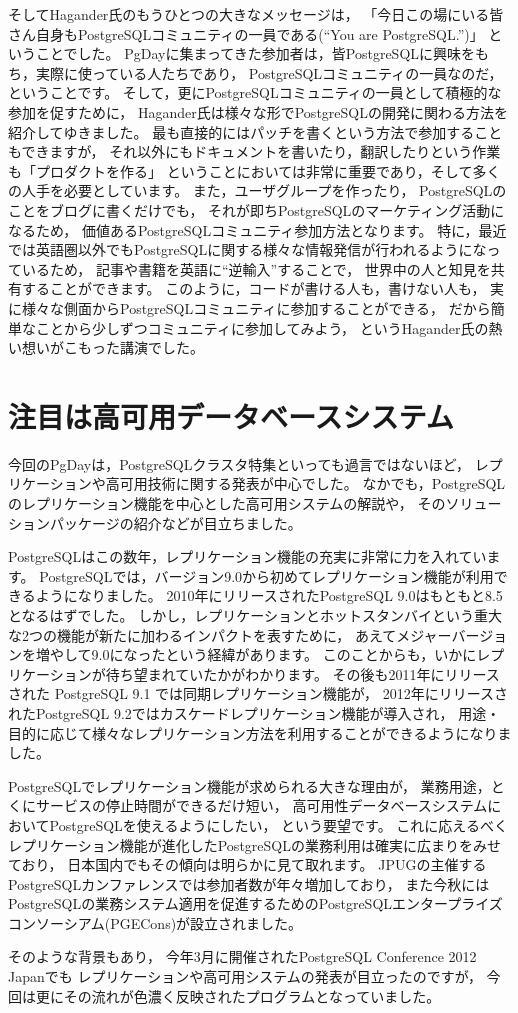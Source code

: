 そしてHagander氏のもうひとつの大きなメッセージは，
「今日この場にいる皆さん自身もPostgreSQLコミュニティの一員である(``You are PostgreSQL.'')」
ということでした。
PgDayに集まってきた参加者は，皆PostgreSQLに興味をもち，実際に使っている人たちであり，
PostgreSQLコミュニティの一員なのだ，ということです。
そして，更にPostgreSQLコミュニティの一員として積極的な参加を促すために，
Hagander氏は様々な形でPostgreSQLの開発に関わる方法を紹介してゆきました。
最も直接的にはパッチを書くという方法で参加することもできますが，
それ以外にもドキュメントを書いたり，翻訳したりという作業も「プロダクトを作る」
ということにおいては非常に重要であり，そして多くの人手を必要としています。
また，ユーザグループを作ったり，
PostgreSQLのことをブログに書くだけでも，
それが即ちPostgreSQLのマーケティング活動になるため，
価値あるPostgreSQLコミュニティ参加方法となります。
特に，最近では英語圏以外でもPostgreSQLに関する様々な情報発信が行われるようになっているため，
記事や書籍を英語に``逆輸入''することで，
世界中の人と知見を共有することができます。
このように，コードが書ける人も，書けない人も，
実に様々な側面からPostgreSQLコミュニティに参加することができる，
だから簡単なことから少しずつコミュニティに参加してみよう，
というHagander氏の熱い想いがこもった講演でした。

\section{注目は高可用データベースシステム}

今回のPgDayは，PostgreSQLクラスタ特集といっても過言ではないほど，
レプリケーションや高可用技術に関する発表が中心でした。
なかでも，PostgreSQLのレプリケーション機能を中心とした高可用システムの解説や，
そのソリューションパッケージの紹介などが目立ちました。

PostgreSQLはこの数年，レプリケーション機能の充実に非常に力を入れています。
PostgreSQLでは，バージョン9.0から初めてレプリケーション機能が利用できるようになりました。
2010年にリリースされたPostgreSQL 9.0はもともと8.5となるはずでした。
しかし，レプリケーションとホットスタンバイという重大な2つの機能が新たに加わるインパクトを表すために，
あえてメジャーバージョンを増やして9.0になったという経緯があります。
このことからも，いかにレプリケーションが待ち望まれていたかがわかります。
その後も2011年にリリースされた PostgreSQL 9.1 では同期レプリケーション機能が，
2012年にリリースされたPostgreSQL 9.2ではカスケードレプリケーション機能が導入され，
用途・目的に応じて様々なレプリケーション方法を利用することができるようになりました。

PostgreSQLでレプリケーション機能が求められる大きな理由が，
業務用途，とくにサービスの停止時間ができるだけ短い，
高可用性データベースシステムにおいてPostgreSQLを使えるようにしたい，
という要望です。
これに応えるべくレプリケーション機能が進化したPostgreSQLの業務利用は確実に広まりをみせており，
日本国内でもその傾向は明らかに見て取れます。
JPUGの主催するPostgreSQLカンファレンスでは参加者数が年々増加しており，
また今秋にはPostgreSQLの業務システム適用を促進するためのPostgreSQLエンタープライズコンソーシアム(PGECons)が設立されました。

そのような背景もあり，
今年3月に開催されたPostgreSQL Conference 2012 Japanでも
レプリケーションや高可用システムの発表が目立ったのですが，
今回は更にその流れが色濃く反映されたプログラムとなっていました。

